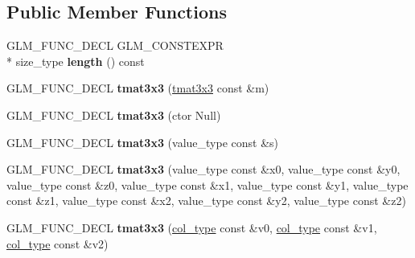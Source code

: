\subsection*{Public Member Functions}
\begin{DoxyCompactItemize}
\item 
\hypertarget{structglm_1_1detail_1_1tmat3x3_ad8613fcc853b72629c4692825f8c9fb7}{G\-L\-M\-\_\-\-F\-U\-N\-C\-\_\-\-D\-E\-C\-L G\-L\-M\-\_\-\-C\-O\-N\-S\-T\-E\-X\-P\-R \\*
size\-\_\-type {\bfseries length} () const }\label{structglm_1_1detail_1_1tmat3x3_ad8613fcc853b72629c4692825f8c9fb7}

\item 
\hypertarget{structglm_1_1detail_1_1tmat3x3_a45e1e8d593c006b63ac0f34f936217f0}{G\-L\-M\-\_\-\-F\-U\-N\-C\-\_\-\-D\-E\-C\-L {\bfseries tmat3x3} (\hyperlink{structglm_1_1detail_1_1tmat3x3}{tmat3x3} const \&m)}\label{structglm_1_1detail_1_1tmat3x3_a45e1e8d593c006b63ac0f34f936217f0}

\item 
\hypertarget{structglm_1_1detail_1_1tmat3x3_a74e9eee7da731f5a47e2464b770c3cf3}{G\-L\-M\-\_\-\-F\-U\-N\-C\-\_\-\-D\-E\-C\-L {\bfseries tmat3x3} (ctor Null)}\label{structglm_1_1detail_1_1tmat3x3_a74e9eee7da731f5a47e2464b770c3cf3}

\item 
\hypertarget{structglm_1_1detail_1_1tmat3x3_a27a2d202aab2cbdec7a5a0df54f4e081}{G\-L\-M\-\_\-\-F\-U\-N\-C\-\_\-\-D\-E\-C\-L {\bfseries tmat3x3} (value\-\_\-type const \&s)}\label{structglm_1_1detail_1_1tmat3x3_a27a2d202aab2cbdec7a5a0df54f4e081}

\item 
\hypertarget{structglm_1_1detail_1_1tmat3x3_ac695982e33626e8671900c4b4216afca}{G\-L\-M\-\_\-\-F\-U\-N\-C\-\_\-\-D\-E\-C\-L {\bfseries tmat3x3} (value\-\_\-type const \&x0, value\-\_\-type const \&y0, value\-\_\-type const \&z0, value\-\_\-type const \&x1, value\-\_\-type const \&y1, value\-\_\-type const \&z1, value\-\_\-type const \&x2, value\-\_\-type const \&y2, value\-\_\-type const \&z2)}\label{structglm_1_1detail_1_1tmat3x3_ac695982e33626e8671900c4b4216afca}

\item 
\hypertarget{structglm_1_1detail_1_1tmat3x3_a3dfee69976020a22913dd7045ff8577b}{G\-L\-M\-\_\-\-F\-U\-N\-C\-\_\-\-D\-E\-C\-L {\bfseries tmat3x3} (\hyperlink{structglm_1_1detail_1_1tvec3}{col\-\_\-type} const \&v0, \hyperlink{structglm_1_1detail_1_1tvec3}{col\-\_\-type} const \&v1, \hyperlink{structglm_1_1detail_1_1tvec3}{col\-\_\-type} const \&v2)}\label{structglm_1_1detail_1_1tmat3x3_a3dfee69976020a22913dd7045ff8577b}


\end{DoxyCompactItemize}

